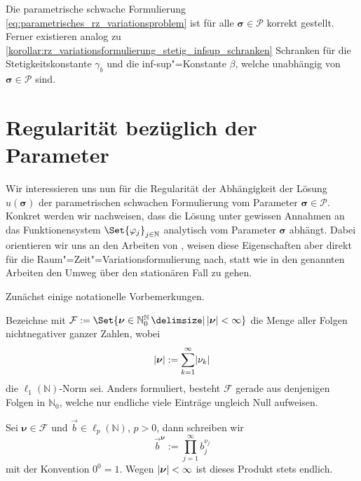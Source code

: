 \begin{Korollar}
\label{korollar:parametrisches_rz_variationsproblem_sachgemaess}
    Die parametrische schwache Formulierung \cref{eq:parametrisches_rz_variationsproblem} ist für alle $\bm\sigma \in \mathcal P$ korrekt gestellt.
    Ferner existieren analog zu \cref{korollar:rz_variationsformulierung_stetig_infsup_schranken} Schranken für die Stetigkeitskonstante $\gamma_{b}$ und die inf-sup"=Konstante $\beta$, welche unabhängig von $\bm \sigma \in \mathcal P$ sind.
\end{Korollar}


\section{Regularität bezüglich der Parameter} %
\label{section:regularitaet_bezueglich_der_parameter}

Wir interessieren uns nun für die Regularität der Abhängigkeit der Lösung $u(\bm\sigma)$ der parametrischen schwachen Formulierung vom Parameter $\bm \sigma \in \mathcal P$.
Konkret werden wir nachweisen, dass die Lösung unter gewissen Annahmen an das Funktionensystem $\Set{\varphi_{j}}_{j \in \mathbb{N}}$ analytisch vom Parameter $\bm \sigma$ abhängt.
Dabei orientieren wir uns an den Arbeiten von \textcite{Cohen:2010kz,Cohen:2011jp,Kunoth:2013ef}, weisen diese Eigenschaften aber direkt für die Raum"=Zeit"=Variationsformulierung nach, statt wie in den genannten Arbeiten den Umweg über den stationären Fall zu gehen.

Zunächst einige notationelle Vorbemerkungen.
\begin{Bemerkung}
    Bezeichne mit $\mathcal F := \Set{ \bm\nu \in \mathbb{N}^{\mathbb{N}}_{0} \given \abs{\bm\nu} < \infty }$ die Menge aller Folgen nichtnegativer ganzer Zahlen, wobei
    \begin{equation}
        \lvert\bm\nu\rvert := \sum_{k = 1}^{\infty} \lvert\nu_{k}\rvert
    \end{equation}
    die $\ell_{1}(\mathbb{N})$-Norm sei.
    Anders formuliert, besteht $\mathcal F$ gerade aus denjenigen Folgen in $\mathbb{N}_{0}$, welche nur endliche viele Einträge ungleich Null aufweisen.

    Sei $\bm\nu \in \mathcal F$ und $\vec{b} \in \ell_{p}(\mathbb{N})$, $p > 0$, dann schreiben wir
    \begin{equation}
        \vec{b}^{\bm\nu} := \prod_{j = 1}^{\infty} b_{j}^{\nu_{j}}
    \end{equation}
    mit der Konvention $0^{0} = 1$.
    Wegen $\lvert\bm\nu\rvert < \infty$ ist dieses Produkt stets endlich.
\end{Bemerkung}

